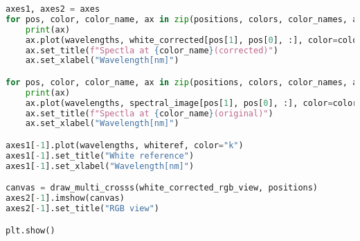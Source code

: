 \begin{lstlisting}[language=python, caption=White correction for Nuance Cmaera with large reference, label={code:wc-nuance-large}]
axes1, axes2 = axes
for pos, color, color_name, ax in zip(positions, colors, color_names, axes2):
    print(ax)
    ax.plot(wavelengths, white_corrected[pos[1], pos[0], :], color=color)
    ax.set_title(f"Spectla at {color_name}(corrected)")
    ax.set_xlabel("Wavelength[nm]")

for pos, color, color_name, ax in zip(positions, colors, color_names, axes1):
    print(ax)
    ax.plot(wavelengths, spectral_image[pos[1], pos[0], :], color=color)
    ax.set_title(f"Spectla at {color_name}(original)")
    ax.set_xlabel("Wavelength[nm]")

axes1[-1].plot(wavelengths, whiteref, color="k")
axes1[-1].set_title("White reference")
axes1[-1].set_xlabel("Wavelength[nm]")

canvas = draw_multi_crosss(white_corrected_rgb_view, positions)
axes2[-1].imshow(canvas)
axes2[-1].set_title("RGB view")

plt.show()

\end{lstlisting}

